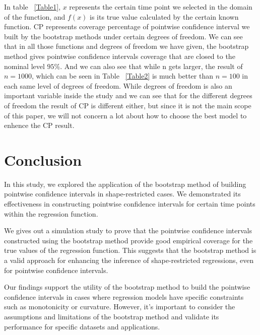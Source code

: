 \documentclass[12pt]{article}
\begin{document}
In table ~\ref{Table1}, \(x\) represents the certain time point we selected in the domain of the function, and \(f(x)\) is its true value calculated by the certain known function. CP represents coverage percentage of pointwise confidence interval we built by the bootstrap methods under certain degrees of freedom. We can see that in all those functions and degrees of freedom we have given, the bootstrap method gives pointwise confidence intervals coverage that are closed to the nominal level \(95\%\). And we can also see that while n gets larger, the result of \(n = 1000\), which can be seen in Table ~\ref{Table2} is much better than \(n = 100\) in each same level of degrees of freedom. While degrees of freedom is also an important variable inside the study and we can see that for the different degrees of freedom the result of CP is different either, but since it is not the main scope of this paper, we will not concern a lot about how to choose the best model to enhence the CP result.

\section{Conclusion}
\label{Conclusion}
In this study, we explored the application of the bootstrap method of building pointwise confidence intervals in shape-restricted cases. We demonstrated its effectiveness in constructing pointwise confidence intervals for certain time points within the regression function. 

We gives out a simulation study to prove that the pointwise confidence intervals constructed using the bootstrap method provide good empirical coverage for the true values of the regression function. This suggests that the bootstrap method is a valid approach for enhancing the inference of shape-restricted regressions, even for pointwise confidence intervals.

Our findings support the utility of the bootstrap method to build the pointwise confidence intervals in cases where regression models have specific constraints such as monotonicity or curvature. However, it's important to consider the assumptions and limitations of the bootstrap method and validate its performance for specific datasets and applications.



\end{document}
